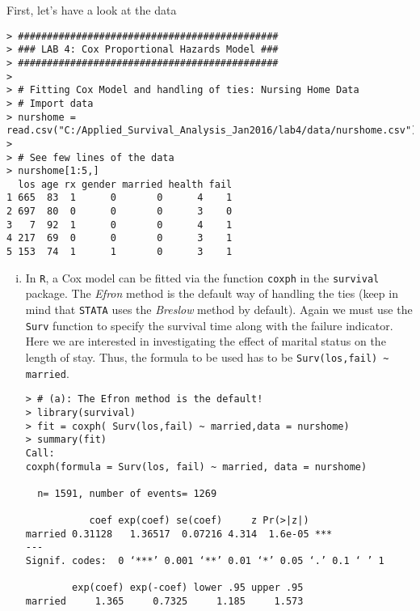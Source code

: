 \begin{enumerate}[(a)]
First, let's have a look at the data
\begin{footnotesize}
\begin{verbatim}
> #############################################
> ### LAB 4: Cox Proportional Hazards Model ###
> #############################################
> 
> # Fitting Cox Model and handling of ties: Nursing Home Data
> # Import data
> nurshome = read.csv("C:/Applied_Survival_Analysis_Jan2016/lab4/data/nurshome.csv")
> 
> # See few lines of the data
> nurshome[1:5,]
  los age rx gender married health fail
1 665  83  1      0       0      4    1
2 697  80  0      0       0      3    0
3   7  92  1      0       0      4    1
4 217  69  0      0       0      3    1
5 153  74  1      1       0      3    1
\end{verbatim}
\end{footnotesize}
\begin{enumerate}[(i)]
\item In \verb|R|, a Cox model can be fitted via the function \verb|coxph| in the \verb|survival| package. The \emph{Efron} method is the default way of handling the ties (keep in mind that \verb|STATA| uses the \emph{Breslow} method by default). Again we must use the \verb|Surv| function to specify the survival time along with the failure indicator. Here we are interested in investigating the effect of marital status on the length of stay. Thus, the formula to be used has to be \verb|Surv(los,fail) ~ married|.
\begin{footnotesize}
\begin{verbatim}
> # (a): The Efron method is the default!
> library(survival)
> fit = coxph( Surv(los,fail) ~ married,data = nurshome)
> summary(fit)
Call:
coxph(formula = Surv(los, fail) ~ married, data = nurshome)

  n= 1591, number of events= 1269 

           coef exp(coef) se(coef)     z Pr(>|z|)    
married 0.31128   1.36517  0.07216 4.314  1.6e-05 ***
---
Signif. codes:  0 ‘***’ 0.001 ‘**’ 0.01 ‘*’ 0.05 ‘.’ 0.1 ‘ ’ 1

        exp(coef) exp(-coef) lower .95 upper .95
married     1.365     0.7325     1.185     1.573


\end{verbatim}
\end{footnotesize}
\end{enumerate}
\end{enumerate}
